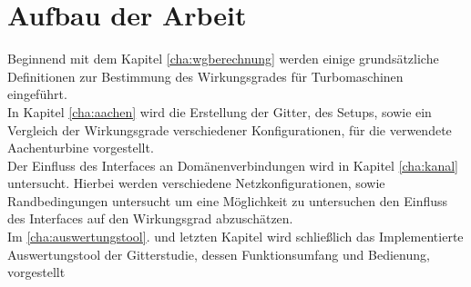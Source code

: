 \section{Aufbau der Arbeit}
Beginnend mit dem Kapitel \ref{cha:wgberechnung} werden einige grundsätzliche Definitionen zur Bestimmung des Wirkungsgrades für Turbomaschinen eingeführt.\\
In Kapitel \ref{cha:aachen} wird die Erstellung der Gitter, des Setups, sowie ein Vergleich der Wirkungsgrade verschiedener Konfigurationen, für die verwendete Aachenturbine vorgestellt.\\
Der Einfluss des Interfaces an Domänenverbindungen wird in Kapitel \ref{cha:kanal} untersucht. Hierbei werden verschiedene Netzkonfigurationen, sowie Randbedingungen untersucht um eine Möglichkeit zu untersuchen den Einfluss des Interfaces auf den Wirkungsgrad abzuschätzen.\\
Im \ref{cha:auswertungstool}. und letzten Kapitel wird schließlich das Implementierte Auswertungstool der Gitterstudie, dessen Funktionsumfang und Bedienung, vorgestellt 